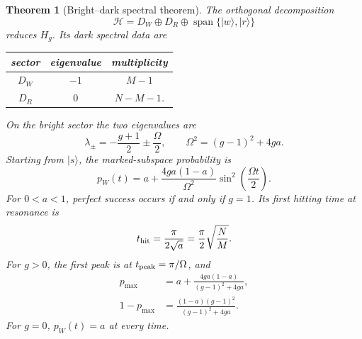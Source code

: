 \documentclass[10pt]{article}
\newtheorem{theorem}{Theorem}
\newcommand{\ket}[1]{|#1\rangle}
\begin{document}
\begin{theorem}[Bright--dark spectral theorem]\label{thm:main}
The orthogonal decomposition
\begin{equation}\label{eq:decomp}
 \mathcal H=D_W\oplus D_R\oplus\operatorname{span}\{\ket w,\ket r\}
\end{equation}
reduces $H_g$.  Its dark spectral data are
\begin{center}
\begin{tabular}{c@{\qquad}c@{\qquad}c}
sector& eigenvalue& multiplicity\\ \hline
$D_W$&$-1$&$M-1$\\
$D_R$&$0$&$N-M-1$.
\end{tabular}
\end{center}
On the bright sector the two eigenvalues are
\begin{equation}\label{eq:eigenvalues}
 \lambda_\pm=-\frac{g+1}{2}\pm\frac{\Omega}{2},\qquad
 \Omega^2=(g-1)^2+4ga.
\end{equation}
Starting from $\ket s$, the marked-subspace probability is
\begin{equation}\label{eq:success}
 p_W(t)=a+\frac{4ga(1-a)}{\Omega^2}
 \sin^2\!\left(\frac{\Omega t}{2}\right).
\end{equation}
For $0<a<1$, perfect success occurs if and only if $g=1$.  Its first hitting
time at resonance is
\begin{equation}\label{eq:firsthit}
 t_{\rm hit}=\frac{\pi}{2\sqrt a}=\frac{\pi}{2}\sqrt{\frac NM}.
\end{equation}
For $g>0$, the first peak is at $t_{\rm peak}=\pi/\Omega$, and
\begin{align}
 p_{\max}&=a+\frac{4ga(1-a)}{(g-1)^2+4ga},\label{eq:pmax}\\
 1-p_{\max}&=\frac{(1-a)(g-1)^2}{(g-1)^2+4ga}.\label{eq:defect}
\end{align}
For $g=0$, $p_W(t)=a$ at every time.
\end{theorem}
\end{document}
